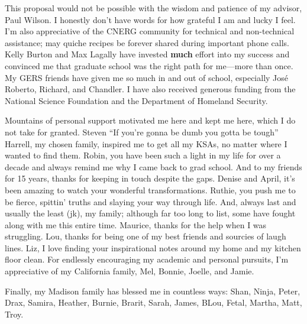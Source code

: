 \footnotesize{
This proposal would not be possible with the wisdom and patience of my advisor,
Paul Wilson. I honestly don't have words for how grateful I am and lucky I
feel.  I'm also appreciative of the CNERG community for technical and
non-technical assistance; may quiche recipes be forever shared during important
phone calls.  Kelly Burton and Max Lagally have invested \textbf{much} effort
into my success and convinced me that graduate school was the right path for
me---more than once.  My GERS friends have given me so much in and out of
school, especially Jos\'e Roberto, Richard, and Chandler.  I have also received
generous funding from the National Science Foundation and the Department of
Homeland Security.

Mountains of personal support motivated me here and kept me here, which I do
not take for granted. Steven ``If you're gonna be dumb you gotta be tough''
Harrell, my chosen family, inspired me to get all my KSAs, no matter where I
wanted to find them. Robin, you have been such a light in my life for over a
decade and always remind me why I came back to grad school.  And to my friends
for 15 years, thanks for keeping in touch despite the gaps.  Denise and April,
it's been amazing to watch your wonderful transformations. Ruthie, you push me
to be fierce, spittin' truths and slaying your way through life.  And, always
last and usually the least (jk), my family; although far too long to list, some
have fought along with me this entire time.  Maurice, thanks for the help when
I was struggling. Lou, thanks for being one of my best friends and sourcies of
laugh lines. Liz, I love finding your inspirational notes around my home and my
kitchen floor clean. For endlessly encouraging my academic and personal
pursuits, I'm appreciative of my California family, Mel, Bonnie, Joelle, and
Jamie. 

Finally, my Madison family has blessed me in countless ways: Shan, Ninja,
Peter, Drax, Samira, Heather, Burnie, Brarit, Sarah, James, BLou, Fetal,
Martha, Matt, Troy.
}
